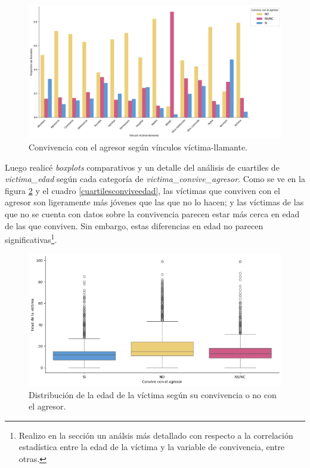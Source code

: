 \documentclass[10 pt]{article}
\begin{document}
\begin{figure}[H]
\begin{center}
\includegraphics[scale=.5]{images/latex_llamante_vin_convive.png}
\caption{Convivencia con el agresor según vínculos víctima-llamante.}
\label{llamvincconvive}
\end{center}
\end{figure} 


Luego realicé \textit{boxplots} comparativos y un detalle del análisis de cuartiles de \textit{victima\_edad} según cada categoría de \textit{victima\_convive\_agresor}. Como se ve en la figura \ref{boxplotsconvivenciaedad} y el cuadro \ref{cuartilesconviveedad}, las víctimas que conviven con el agresor son ligeramente más jóvenes que las que no lo hacen; y las víctimas de las que no se cuenta con datos sobre la convivencia parecen estar más cerca en edad de las que conviven. Sin embargo, estas diferencias en edad no parecen significativas\footnote{Realizo en la sección  un análsis más detallado con respecto a la correlación estadística entre la edad de la víctima y la variable de convivencia, entre otras.}. 

\begin{figure}[H]
    \begin{center}
    \includegraphics[scale=.5]{images/latex_boxplot_convive_edad.png}
    \caption{Distribución de la edad de la víctima según su convivencia o no con el agresor.}
    \label{boxplotsconvivenciaedad}
    \end{center}
    \end{figure}
\end{document}
